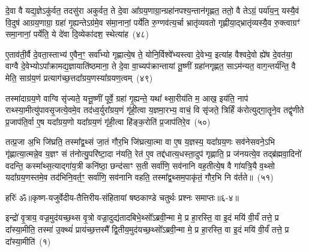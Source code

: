 दे॒वा वै यद्य॒ज्ञे\-ऽकु॑र्वत॒ तदसु॑रा अकुर्वत॒ ते दे॒वा आ᳚ग्रय॒णाग्रा॒न्ग्रहा॑नपश्य॒न्तान॑गृह्णत॒ ततो॒ वै ते\-ऽग्रं॒ पर्या॑य॒न्॒ यस्यै॒वं वि॒दुष॑ आग्रय॒णाग्रा॒ ग्रहा॑ गृ॒ह्यन्ते\-ऽग्र॑मे॒व स॑मा॒नानां॒ पर्ये॑ति रु॒ग्णव॑त्य॒र्चा भ्रातृ॑व्यवतो गृह्णीया॒द्भ्रातृ॑व्यस्यै॒व रु॒क्त्वाग्रꣳ॑ समा॒नानां॒ पर्ये॑ति॒ ये दे॑वा दि॒व्येका॑\-दश॒ स्थेत्या॑ह~(४८)

ए॒ताव॑ती॒र्वै दे॒वता॒स्ताभ्य॑ ए॒वैन॒ꣳ॒ सर्वा᳚भ्यो गृह्णात्ये॒ष ते॒ योनि॒र्विश्वे᳚भ्यस्त्वा दे॒वेभ्य॒ इत्या॑ह वैश्वदे॒वो ह्ये॑ष दे॒वत॑या॒ वाग्वै दे॒वेभ्यो\-ऽपा᳚क्रामद्य॒ज्ञायाति॑ष्ठमाना॒ ते दे॒वा वा॒च्यप॑क्रान्तायां तू॒ष्णीं ग्रहा॑नगृह्णत॒ सा\-ऽम॑न्यत॒ वाग॒न्तर्य॑न्ति॒ वै मेति॒ साग्र॑य॒णं प्रत्याग॑च्छ॒त्तदा᳚ग्रय॒णस्या᳚ग्रयण॒त्वम्~(४९)

तस्मा॑दाग्रय॒णे वाग्वि सृ॑ज्यते॒ यत्तू॒ष्णीं पूर्वे॒ ग्रहा॑ गृ॒ह्यन्ते॒ यथा᳚ थ्सा॒रीय॑ति म॒ आख॒ इय॑ति॒ नाप॑ राथ्स्या॒मीत्यु॑पावसृ॒जत्ये॒वमे॒व तद॑ध्व॒र्युरा᳚ग्रय॒णं गृ॑ही॒त्वा य॒ज्ञमा॒रभ्य॒ वाचं॒ वि सृ॑जते॒ त्रिर्\mbox{}हिं क॑रोत्युद्गा॒तॄने॒व तद्वृ॑णीते प्र॒जा\-प॑ति॒र्वा ए॒ष यदा᳚ग्रय॒णो यदा᳚ग्रय॒णं गृ॑ही॒त्वा हि॑ङ्क॒रोति॑ प्र॒जा\-प॑तिरे॒व~(५०)

तत्प्र॒जा अ॒भि जि॑घ्रति॒ तस्मा᳚द्व॒थ्सं जा॒तं गौर॒भि जि॑घ्रत्या॒त्मा वा ए॒ष य॒ज्ञस्य॒ यदा᳚ग्रय॒णः सव॑नेसवने॒\-ऽभि गृ॑ह्णात्या॒त्मन्ने॒व य॒ज्ञꣳ सं त॑नोत्यु॒परि॑ष्टा॒दा न॑यति॒ रेत॑ ए॒व तद्द॑धात्य॒धस्ता॒दुप॑ गृह्णाति॒ प्र ज॑नयत्ये॒व तद्ब्र॑ह्मवा॒दिनो॑ वदन्ति॒ कस्मा᳚थ्स॒त्याद्गा॑य॒त्री कनि॑ष्ठा॒ छन्द॑साꣳ स॒ती सर्वा॑णि॒ सव॑नानि वह॒तीत्ये॒ष वै गा॑यत्रि॒यै व॒थ्सो यदा᳚ग्रय॒णस्तमे॒व तद॑भिनि॒वर्त॒ꣳ॒ सर्वा॑णि॒ सव॑नानि वहति॒ तस्मा᳚द्व॒थ्सम॒पाकृ॑तं॒ गौर॒भि नि व॑र्तते॥~(५१)

{\anuvakamend[{आ॒हा॒ग्र॒य॒ण॒त्वं प्र॒जा\-प॑तिरे॒वेति॑ विꣳश॒तिश्च॑}]}%

{हरिः॑ ॐ}{॥कृष्ण-यजुर्वेदीय-तैत्तिरीय-संहितायां षष्ठकाण्डे चतुर्थः प्रश्नः समाप्तः॥६-४॥}

\setcounter{anuvakam}{0}
इन्द्रो॑ वृ॒त्राय॒ वज्र॒मुद॑यच्छ॒थ्स वृ॒त्रो वज्रा॒दुद्य॑तादबिभे॒थ्सो᳚\-ऽब्रवी॒न्मा मे॒ प्र हा॒रस्ति॒ वा इ॒दं मयि॑ वी॒र्यं॑ तत्ते॒ प्र दा᳚स्या॒मीति॒ तस्मा॑ उ॒क्थ्यं॑ प्राय॑च्छ॒त्तस्मै᳚ द्वि॒तीय॒मुद॑यच्छ॒थ्सो᳚\-ऽब्रवी॒न्मा मे॒ प्र हा॒रस्ति॒ वा इ॒दं मयि॑ वी॒र्यं॑ तत्ते॒ प्र दा᳚स्या॒मीति॑~(१)

